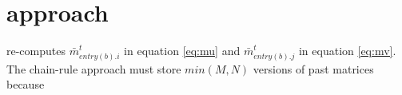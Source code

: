 \section{approach}
\tool re-computes $\bar{m}_{entry(b).i}^{t}$ in equation \ref{eq:mu} and $\bar{m}_{entry(b).j}^{t}$ in equation \ref{eq:mv}.
The chain-rule approach must store $min(M,N)$ versions of past matrices because 


